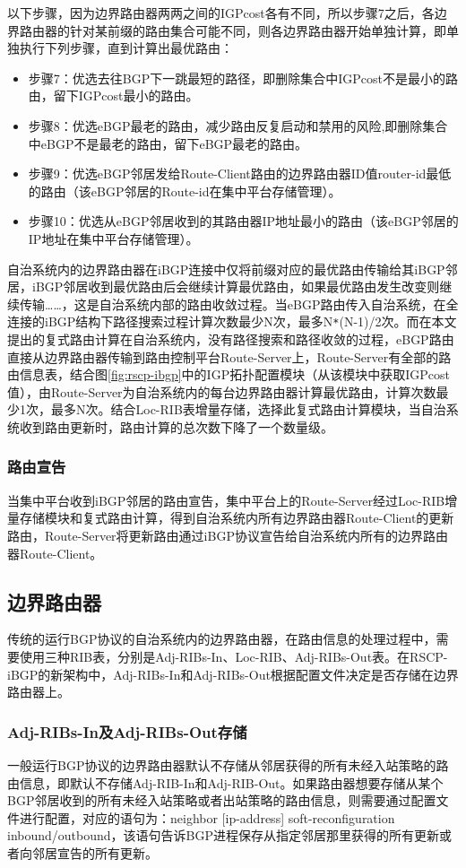 以下步骤，因为边界路由器两两之间的IGPcost各有不同，所以步骤7之后，各边界路由器的针对某前缀的路由集合可能不同，则各边界路由器开始单独计算，即单独执行下列步骤，直到计算出最优路由：
\begin{itemize}
    \item 步骤7：优选去往BGP下一跳最短的路径，即删除集合中IGPcost不是最小的路由，留下IGPcost最小的路由。
    \item 步骤8：优选eBGP最老的路由，减少路由反复启动和禁用的风险,即删除集合中eBGP不是最老的路由，留下eBGP最老的路由。
    \item 步骤9：优选eBGP邻居发给Route-Client路由的边界路由器ID值router-id最低的路由（该eBGP邻居的Route-id在集中平台存储管理）。
    \item 步骤10：优选从eBGP邻居收到的其路由器IP地址最小的路由（该eBGP邻居的IP地址在集中平台存储管理）。
\end{itemize}


自治系统内的边界路由器在iBGP连接中仅将前缀对应的最优路由传输给其iBGP邻居，iBGP邻居收到最优路由后会继续计算最优路由，如果最优路由发生改变则继续传输……，这是自治系统内部的路由收敛过程。当eBGP路由传入自治系统，在全连接的iBGP结构下路径搜索过程计算次数最少N次，最多N\verb+*+(N-1)/2次。而在本文提出的复式路由计算在自治系统内，没有路径搜索和路径收敛的过程，eBGP路由直接从边界路由器传输到路由控制平台Route-Server上，Route-Server有全部的路由信息表，结合图\ref{fig:rscp-ibgp}中的IGP拓扑配置模块（从该模块中获取IGPcost值），由Route-Server为自治系统内的每台边界路由器计算最优路由，计算次数最少1次，最多N次。结合Loc-RIB表增量存储，选择此复式路由计算模块，当自治系统收到路由更新时，路由计算的总次数下降了一个数量级。

\subsubsection{路由宣告}
当集中平台收到iBGP邻居的路由宣告，集中平台上的Route-Server经过Loc-RIB增量存储模块和复式路由计算，得到自治系统内所有边界路由器Route-Client的更新路由，Route-Server将更新路由通过iBGP协议宣告给自治系统内所有的边界路由器Route-Client。

\subsection{边界路由器}
传统的运行BGP协议的自治系统内的边界路由器，在路由信息的处理过程中，需要使用三种RIB表，分别是Adj-RIBs-In、Loc-RIB、Adj-RIBs-Out表。在RSCP-iBGP的新架构中，Adj-RIBs-In和Adj-RIBs-Out根据配置文件决定是否存储在边界路由器上。

\subsubsection{Adj-RIBs-In及Adj-RIBs-Out存储}
一般运行BGP协议的边界路由器默认不存储从邻居获得的所有未经入站策略的路由信息，即默认不存储Adj-RIB-In和Adj-RIB-Out。如果路由器想要存储从某个BGP邻居收到的所有未经入站策略或者出站策略的路由信息，则需要通过配置文件进行配置，对应的语句为：neighbor [ip-address] soft-reconfiguration inbound/outbound，该语句告诉BGP进程保存从指定邻居那里获得的所有更新或者向邻居宣告的所有更新。


